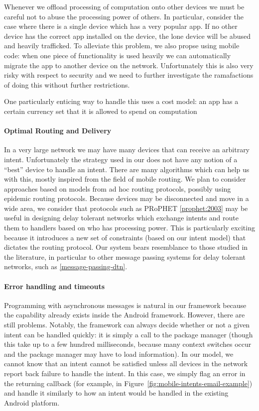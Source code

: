 \documentclass{acm_proc_article-sp}
\begin{document}
Whenever we offload processing of computation onto other devices we
must be careful not to abuse the processing power of others.  In
particular, consider the case where there is a single device which has
a very popular app.  If no other device has the correct app installed
on the device, the lone device will be abused and heavily trafficked.
To alleviate this problem, we also propse using mobile code: when one
piece of functionality is used heavily we can automatically migrate
the app to another device on the network.  Unfortunately this is also
very risky with respect to security and we need to further investigate
the ramafactions of doing this without further restrictions.

One particularly enticing way to handle this uses a cost model: an app
has a certain currency set that it is allowed to spend on computation

\paragraph{Optimal Routing and Delivery}

In a very large network we may have many devices that can receive an
arbitrary intent.  Unfortunately the strategy used in our does not
have any notion of a ``best'' device to handle an intent.  There are
many algorithms which can help us with this, mostly inspired from the
field of mobile routing.  We plan to consider approaches based on
models from ad hoc routing protocols, possibly using epidemic routing
protocols.  Because devices may be disconnected and move in a wide
area, we consider that protocols such as PRoPHET \ref{prophet:2003}
may be useful in designing delay tolerant networks which exchange
intents and route them to handlers based on who has processing power.
This is particularly exciting because it introduces a new set of
constraints (based on our intent model) that dictates the routing
protocol.  Our system bears resemblance to those studied in the
literature, in particular to other message passing systems for delay
tolerant networks, such as \ref{message-passing-dtn}.

\paragraph{Error handling and timeouts} 

Programming with asynchronous messages is natural in our framework
because the capability already exists inside the Android framework.
However, there are still problems.  Notably, the framework can always
decide whether or not a given intent can be handled quickly: it is
simply a call to the package manager (though this take up to a few
hundred milliseconds, because many context switches occur and the
package manager may have to load information).  In our model, we
cannot know that an intent cannot be satisfied unless all devices in
the network report back failure to handle the intent.  In this case,
we simply flag an error in the returning callback (for example, in
Figure~\ref{fig:mobile-intents-email-example}) and handle it similarly
to how an intent would be handled in the existing Android platform.
\end{document}
